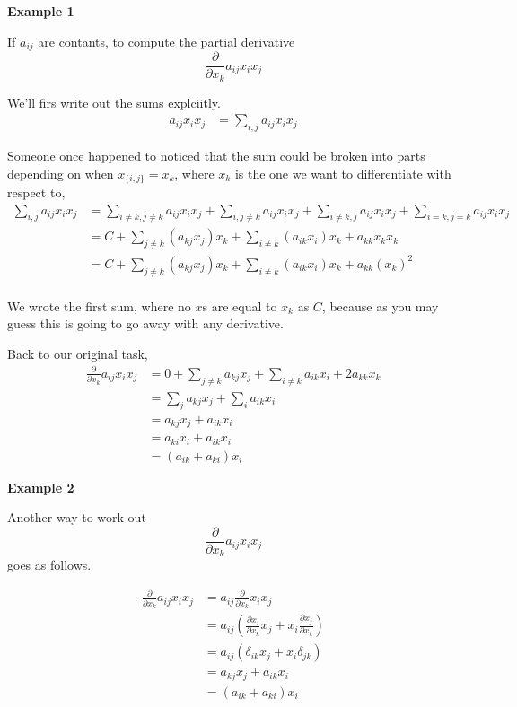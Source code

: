 \textbf{Example 1}

If $a_{ij}$ are contants, to compute the partial derivative
$$
\frac{\partial}{\partial x_k} a_{ij} x_i x_j
$$

We'll firs write out the sums explciitly.
\begin{align*}
a_{ij} x_i x_j &= \sum_{i,j} a_{ij} x_i x_j
\end{align*}

Someone once happened to noticed that the sum could be broken into parts depending on when $x_{\{i,j\}} = x_k$, where $x_k$
is the one we want to differentiate with respect to,
\begin{align*}
\sum_{i,j} a_{ij} x_i x_j &=
    \sum_{i \neq k, j \neq k} a_{ij} x_i x_j +
    \sum_{i, j \neq k} a_{ij} x_i x_j + 
    \sum_{i \neq k, j} a_{ij} x_i x_j +
    \sum_{i=k, j=k} a_{ij} x_i x_j \\
&= C + \sum_{j \neq k} \left( a_{kj} x_j \right) x_k +
    \sum_{i \neq k} \left( a_{ik} x_i \right) x_k +
    a_{kk} x_k x_k \\
    &= C + \sum_{j \neq k} \left( a_{kj} x_j \right) x_k +
    \sum_{i \neq k} \left( a_{ik} x_i \right) x_k +
    a_{kk} (x_k)^2 \\
\end{align*}

We wrote the first sum, where no $x$s are equal to $x_k$ as $C$, because as you may guess this is going to go away with
any derivative.

Back to our original task,
\begin{align*}
\frac{\partial}{\partial x_k} a_{ij} x_i x_j &=
    0 + \sum_{j \neq k} a_{kj} x_j +
    \sum_{i \neq k} a_{ik} x_i +
    2 a_{kk} x_k \\
&= \sum_{j} a_{kj} x_j + \sum_{i} a_{ik} x_i \\
&= a_{kj} x_j + a_{ik} x_i \\
&= a_{ki} x_i + a_{ik} x_i \\
&= (a_{ik} + a_{ki}) x_i
\end{align*}



\textbf{Example 2}

Another way to work out
$$
\frac{\partial}{\partial x_k} a_{ij} x_i x_j
$$
goes as follows.

\begin{align*}
\frac{\partial}{\partial x_k} a_{ij} x_i x_j &= a_{ij} \frac{\partial}{\partial x_k} x_i x_j \\
&= a_{ij} \left( \frac{\partial x_i}{\partial x_k} x_j + x_i \frac{\partial x_j}{\partial x_k} \right) \\
&= a_{ij} \left( \delta_{ik} x_j + x_i \delta_{jk} \right) \\
&= a_{kj} x_j + a_{ik} x_i \\
&= (a_{ik} + a_{ki}) x_i
\end{align*}


